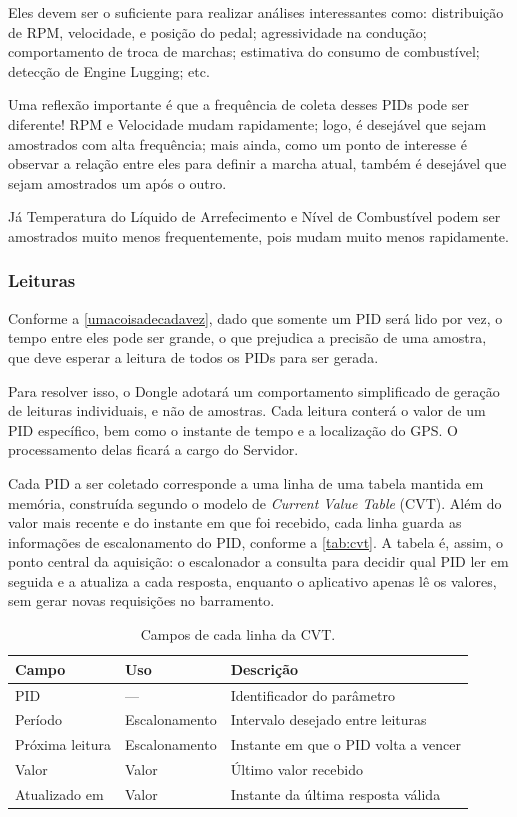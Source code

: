 \documentclass[12pt]{article}
\begin{document}
Eles devem ser o suficiente para realizar análises interessantes como: distribuição de RPM, velocidade, e posição do pedal; agressividade na condução; comportamento de troca de marchas;  estimativa do consumo de combustível; detecção de Engine Lugging;  etc.

Uma reflexão importante é que a frequência de coleta desses PIDs pode ser diferente! RPM e Velocidade mudam rapidamente; logo, é desejável que sejam amostrados com alta frequência; mais ainda, como um ponto de interesse é observar a relação entre eles para definir a marcha atual, também é desejável que sejam amostrados um após o outro. 

Já Temperatura do Líquido de Arrefecimento e Nível de Combustível podem ser amostrados muito menos frequentemente, pois mudam muito menos rapidamente.

\subsubsection{Leituras}

Conforme a \autoref{umacoisadecadavez}, dado que somente um PID será lido por vez, o tempo entre eles pode ser grande, o que prejudica a precisão de uma amostra, que deve esperar a leitura de todos os PIDs para ser gerada. 

Para resolver isso, o Dongle adotará um comportamento simplificado de geração de leituras individuais, e não de amostras. Cada leitura conterá o valor de um PID específico, bem como o instante de tempo e a localização do GPS. O processamento delas ficará a cargo do Servidor.

Cada PID a ser coletado corresponde a uma linha de uma tabela mantida em memória, construída segundo o modelo de \emph{Current Value Table} (CVT). Além do valor mais recente e do instante em que foi recebido, cada linha guarda as informações de escalonamento do PID, conforme a \autoref{tab:cvt}. A tabela é, assim, o ponto central da aquisição: o escalonador a consulta para decidir qual PID ler em seguida e a atualiza a cada resposta, enquanto o aplicativo apenas lê os valores, sem gerar novas requisições no barramento.

\begin{table}[htbp]
  \centering
  \caption{Campos de cada linha da CVT.}
  \label{tab:cvt}
  \begin{tabular}{lll}
    \toprule
    Campo & Uso & Descrição \\
    \midrule
    PID          & ---           & Identificador do parâmetro \\
    Período      & Escalonamento & Intervalo desejado entre leituras \\
    Próxima leitura & Escalonamento & Instante em que o PID volta a vencer \\
    Valor        & Valor         & Último valor recebido \\
    Atualizado em & Valor        & Instante da última resposta válida \\
    \bottomrule
  \end{tabular}
\end{table}
\end{document}
